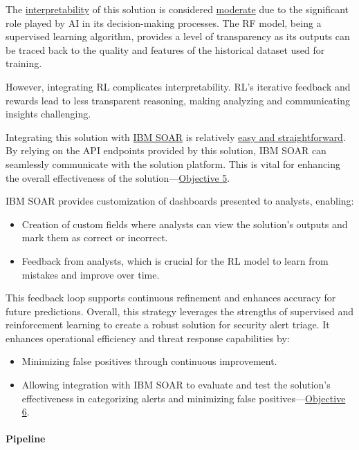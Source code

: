 The \underline{interpretability} of this solution is considered \underline{moderate} due to the significant role played by AI in its decision-making processes. 
The RF model, being a supervised learning algorithm, provides a level of transparency as its outputs can be traced back to the quality and features of the historical dataset used for training. 

However, integrating RL complicates interpretability. RL's iterative feedback and rewards lead to less transparent reasoning, making analyzing and communicating insights challenging.

Integrating this solution with \underline{IBM SOAR} is relatively \underline{easy and straightforward}. 
By relying on the API endpoints provided by this solution, IBM SOAR can seamlessly communicate with the solution platform.
This is vital for enhancing the overall effectiveness of the solution—\hyperref[objective5]{Objective 5}. 

IBM SOAR provides customization of dashboards presented to analysts, enabling:

\begin{itemize}
    \item Creation of custom fields where analysts can view the solution's outputs and mark them as correct or incorrect.
    \item Feedback from analysts, which is crucial for the RL model to learn from mistakes and improve over time.
\end{itemize}

This feedback loop supports continuous refinement and enhances accuracy for future predictions. 
Overall, this strategy leverages the strengths of supervised and reinforcement learning to create a robust solution for security alert triage. 
It enhances operational efficiency and threat response capabilities by:

\begin{itemize}
    \item Minimizing false positives through continuous improvement.
    \item Allowing integration with IBM SOAR to evaluate and test the solution's effectiveness in categorizing alerts and minimizing false positives—\hyperref[objective6]{Objective 6}.
\end{itemize}

\paragraph{Pipeline} 

